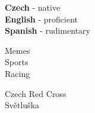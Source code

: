 \documentclass[9pt]{developercv} %
\begin{document}
\begin{minipage}[t]{0.2\textwidth}
	\vspace{-\baselineskip} %

	
	\textbf{Czech} - native\\
	\textbf{English} - proficient\\
	\textbf{Spanish} - rudimentary\\
\end{minipage}
\hfill
\begin{minipage}[t]{0.2\textwidth}
	\vspace{-\baselineskip} %
	

	Memes\\
	Sports\\
	Racing
\end{minipage}
\hfill
\begin{minipage}[t]{0.15\textwidth}
	\vspace{-\baselineskip} %
	
	
	Czech Red Cross\\
	Světluška
\end{minipage}
\end{document}
